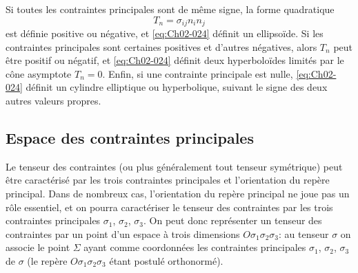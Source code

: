 Si toutes les contraintes principales sont de même signe, la forme quadratique 
\begin{equation}
    T_n = \sigma_{ij} n_i n_j
    \label{eq:Ch02-026}
\end{equation}
est définie positive ou négative, et \eqref{eq:Ch02-024} définit un ellipsoïde.
Si les contraintes principales sont certaines positives et d'autres négatives, alors $T_n$ peut être positif ou négatif, et \eqref{eq:Ch02-024} définit deux hyperboloïdes limités par le cône asymptote $T_n = 0$.
Enfin, si une contrainte principale est nulle, \eqref{eq:Ch02-024} définit un cylindre elliptique ou hyperbolique, suivant le signe des deux autres valeurs propres. 
\subsection{Espace des contraintes principales} \label{ssec:Ch02-2.2}
Le tenseur des contraintes (ou plus généralement tout tenseur symétrique) peut être caractérisé par les trois contraintes principales et l'orientation du repère principal.
Dans de nombreux cas, l'orientation du repère principal ne joue pas un rôle essentiel, et on pourra caractériser le tenseur des contraintes par les trois contraintes principales $\sigma_1$, $\sigma_2$, $\sigma_3$.
On peut donc représenter un tenseur des contraintes par un point d'un espace à trois dimensions $O\sigma_1\sigma_2\sigma_3$: au tenseur $\mathbb{\sigma}$ on associe le point $\Sigma$ ayant comme coordonnées les contraintes principales $\sigma_1$, $\sigma_2$, $\sigma_3$ de $\mathbb{\sigma}$ (le repère $O\sigma_1\sigma_2\sigma_3$ étant postulé orthonormé).

